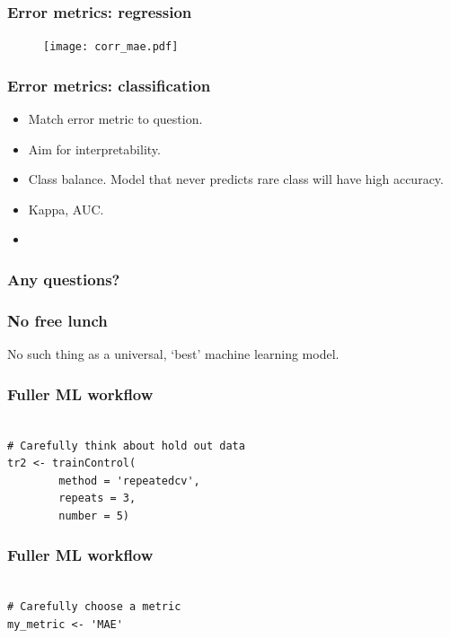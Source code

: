 \documentclass[handout, aspectratio = 169]{beamer}
\begin{document}
\begin{frame}
\frametitle{Error metrics: regression}
\begin{figure}
    \texttt{[image: corr\_mae.pdf]}
\end{figure} 

\end{frame} 



\begin{frame}
\frametitle{Error metrics: classification}

\begin{itemize}
\item Match error metric to question.
\item Aim for interpretability.
\item Class balance. Model that never predicts rare class will have high accuracy.
\item Kappa, AUC.
\item 
\end{itemize}
\end{frame} 



\begin{frame}
\frametitle{Any questions?}


\end{frame} 



\begin{frame}
\frametitle{No free lunch}
No such thing as a universal, `best' machine learning model.
\end{frame} 




	

\begin{frame}[fragile]
\frametitle{Fuller ML workflow}
\begin{Verbatim}

# Carefully think about hold out data
tr2 <- trainControl(
        method = 'repeatedcv',
        repeats = 3,
        number = 5)

\end{Verbatim}

\end{frame} 


\begin{frame}[fragile]
\frametitle{Fuller ML workflow}
\begin{Verbatim}

# Carefully choose a metric
my_metric <- 'MAE'

\end{Verbatim}

\end{frame} 
\end{document}
